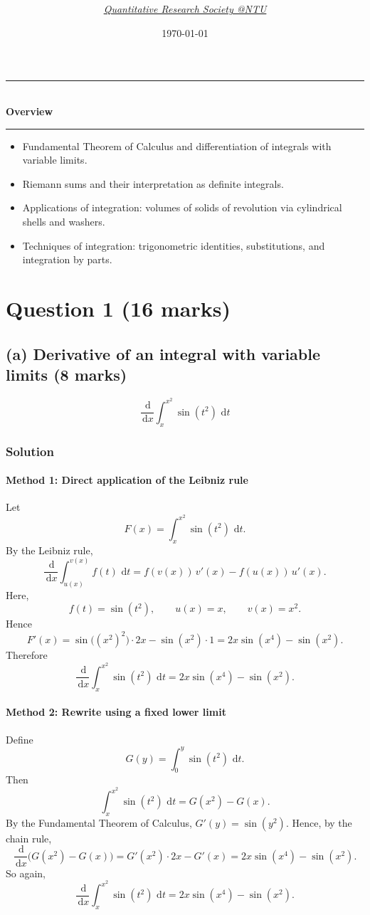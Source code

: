 \documentclass[12pt]{article}
\title{
\Huge \CourseCode\ \CourseName \\[0.3em]
\Large \DocType \\[0.3em]
\large \ExamMeta
}
\author{
  \textit{\href{https://qrsntu.org}{Quantitative Research Society @NTU}}
}
\date{\today}
\newcommand{\dd}{\,\mathrm{d}}
\newenvironment{overview}{
  \par\bigskip
  \begin{center}
    \rule{0.92\linewidth}{0.6pt}\\[-0.2em]
    \textbf{Overview}\\[-0.2em]
    \rule{0.92\linewidth}{0.6pt}
  \end{center}
  \vspace{-0.3em}
  \begin{itemize}[leftmargin=1.6em, itemsep=0.2em, topsep=0.2em]
}{
  \end{itemize}
  \par\bigskip
}
\begin{document}
\maketitle
\thispagestyle{plainfirst}
\pagestyle{main}

\begin{overview}
  \item Fundamental Theorem of Calculus and differentiation of integrals with variable limits.
  \item Riemann sums and their interpretation as definite integrals.
  \item Applications of integration: volumes of solids of revolution via cylindrical shells and washers.
  \item Techniques of integration: trigonometric identities, substitutions, and integration by parts.
\end{overview}

\newpage
\tableofcontents
\newpage

\section[Question 1 (16 marks)]{Question 1 \hfill (16 marks)}

\subsection{(a) Derivative of an integral with variable limits \hfill (8 marks)}

\[
\frac{\dd}{\dd x}\int_x^{x^2}\sin(t^2)\,\dd t
\]

\subsubsection{Solution}

\paragraph{Method 1: Direct application of the Leibniz rule}
Let
\[
F(x)=\int_x^{x^2}\sin(t^2)\,\dd t.
\]
By the Leibniz rule,
\[
\frac{\dd}{\dd x}\int_{u(x)}^{v(x)} f(t)\,\dd t
=f(v(x))\,v'(x)-f(u(x))\,u'(x).
\]
Here,
\[
f(t)=\sin(t^2),\qquad u(x)=x,\qquad v(x)=x^2.
\]
Hence
\[
F'(x)=\sin\bigl((x^2)^2\bigr)\cdot 2x-\sin(x^2)\cdot 1
=2x\sin(x^4)-\sin(x^2).
\]
Therefore
\[
\boxed{
\frac{\dd}{\dd x}\int_x^{x^2}\sin(t^2)\,\dd t
=2x\sin(x^4)-\sin(x^2).
}
\]

\paragraph{Method 2: Rewrite using a fixed lower limit}
Define
\[
G(y)=\int_0^y \sin(t^2)\,\dd t.
\]
Then
\[
\int_x^{x^2}\sin(t^2)\,\dd t=G(x^2)-G(x).
\]
By the Fundamental Theorem of Calculus,
\(
G'(y)=\sin(y^2).
\)
Hence, by the chain rule,
\[
\frac{\dd}{\dd x}\bigl(G(x^2)-G(x)\bigr)
=G'(x^2)\cdot 2x-G'(x)
=2x\sin(x^4)-\sin(x^2).
\]
So again,
\[
\boxed{
\frac{\dd}{\dd x}\int_x^{x^2}\sin(t^2)\,\dd t
=2x\sin(x^4)-\sin(x^2).
}
\]
\end{document}
